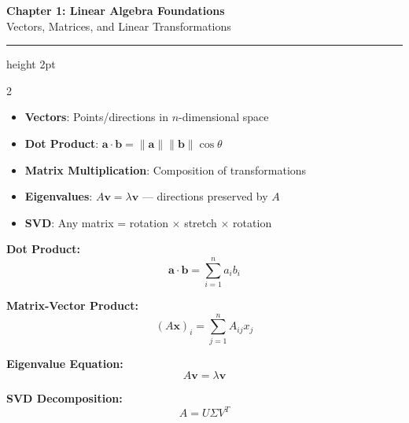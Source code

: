 \documentclass[11pt,letterpaper]{article}
\begin{document}
\begin{center}
{\LARGE\bfseries\color{primaryblue} Chapter 1: Linear Algebra Foundations}\\[3pt]
{\large Vectors, Matrices, and Linear Transformations}
\end{center}
\vspace{-5pt}
\hrule height 2pt
\vspace{8pt}

\begin{multicols}{2}

\begin{tcolorbox}[conceptbox, title={\faLightbulb\ Key Concepts}]
\begin{itemize}
    \item \textbf{Vectors}: Points/directions in $n$-dimensional space
    \item \textbf{Dot Product}: $\mathbf{a} \cdot \mathbf{b} = \|\mathbf{a}\|\|\mathbf{b}\|\cos\theta$
    \item \textbf{Matrix Multiplication}: Composition of transformations
    \item \textbf{Eigenvalues}: $A\mathbf{v} = \lambda\mathbf{v}$ --- directions preserved by $A$
    \item \textbf{SVD}: Any matrix = rotation $\times$ stretch $\times$ rotation
\end{itemize}
\end{tcolorbox}

\begin{tcolorbox}[formulabox, title={\faCalculator\ Core Formulas}]
\textbf{Dot Product:}
\[ \mathbf{a} \cdot \mathbf{b} = \sum_{i=1}^{n} a_i b_i \]

\textbf{Matrix-Vector Product:}
\[ (A\mathbf{x})_i = \sum_{j=1}^{n} A_{ij} x_j \]

\textbf{Eigenvalue Equation:}
\[ A\mathbf{v} = \lambda\mathbf{v} \]

\textbf{SVD Decomposition:}
\[ A = U\Sigma V^T \]
\end{tcolorbox}

\columnbreak

\begin{center}
\end{center}
\end{multicols}
\end{document}
